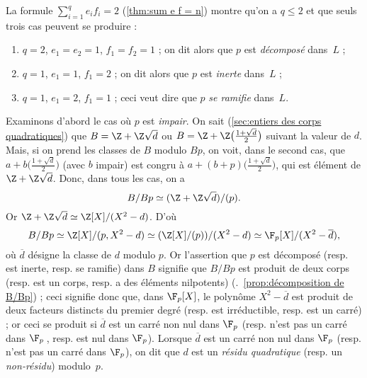 \documentclass[11pt, %
  title in boldface,
  theorem in new line,
  theorem numbering = section,
  number theorems separately,
  simple name,
]{beaulivre}
\begin{document}
    La formule \( \sum_{i=1}^q e_i f_i = 2 \) (\cref{thm:sum e f = n}) montre qu'on a \( q \leqslant 2 \) et que seuls trois cas peuvent se produire :
    \begin{enumerate}
        \item \( q = 2 \), \( e_1 = e_2 = 1 \), \( f_1 = f_2 = 1 \) ; on dit alors que \( p \) est \emph{décomposé} dans~\( L \) ;
        \item \( q = 1 \), \( e_1 = 1 \), \( f_1 = 2 \) ; on dit alors que \( p \) est \emph{inerte} dans~\( L \) ;
        \item \( q = 1 \), \( e_1 = 2 \), \( f_1 = 1 \) ; ceci veut dire que \( p \) \emph{se ramifie} dans~\( L \).
    \end{enumerate}
    Examinons d'abord le cas où \( p \) est \emph{impair}. On sait (\cref{sec:entiers des corps quadratiques}) que \( B = \Z + \Z \sqrt{d} \) ou \( B = \Z + \Z \bigl(\frac{1+\sqrt{d}}{2}\bigr) \) suivant la valeur de \( d \). Mais, si on prend les classes de \( B \) modulo \( Bp \), on voit, dans le second cas, que \( a+b\bigl(\frac{1+\sqrt{d}}{2}\bigr) \) (avec \( b \) impair) est congru à \( a + (b+p) \bigl(\frac{1+\sqrt{d}}{2}\bigr) \), qui est élément de \( \Z + \Z \sqrt{d} \). Donc, dans tous les cas, on a
    \[
        B/Bp \simeq (\Z + \Z \sqrt{d}) / (p).
    \]
    Or \( \Z + \Z \sqrt{d} \simeq \Z[X]/(X^2-d) \). D'où
    \[
        B/Bp \simeq \Z[X]/(p,X^2-d) \simeq (\Z[X]/(p))/(X^2-d) \simeq \F_p[X]/(X^2-\overline{d}),
    \]
    où \( \overline{d} \) désigne la classe de \( d \) modulo \( p \). Or l'assertion que \( p \) est décomposé (resp. est inerte, resp. se ramifie) dans \( B \) signifie que \( B/Bp \) est produit de deux corps (resp. est un corps, resp. a des éléments nilpotents) (\cf.~\cref{prop:décomposition de B/Bp}) ; ceci signifie donc que, dans \( \F_p[X] \), le polynôme \( X^2-\overline{d} \) est produit de deux facteurs distincts du premier degré (resp. est irréductible, resp. est un carré) ; or ceci se produit si \( \overline{d} \) est un carré non nul dans \( \F_p \) (resp. n'est pas un carré dans \( \F_p \)\,, resp. est nul dans \( \F_p \)). Lorsque \( \overline{d} \) est un carré non nul dans \( \F_p \) (resp. n'est pas un carré dans \( \F_p \)), on dit que \( d \) est un \emph{résidu quadratique} (resp. un \emph{non-résidu}) modulo~\( p \).
\end{document}
